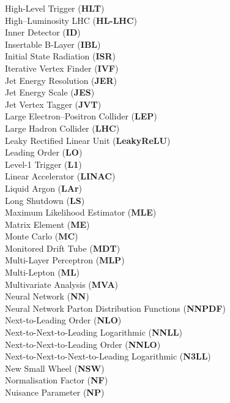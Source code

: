 High-Level Trigger (\textbf{HLT}) \\
High–Luminosity LHC (\textbf{HL-LHC}) \\
Inner Detector (\textbf{ID}) \\
Insertable B-Layer (\textbf{IBL}) \\
Initial State Radiation (\textbf{ISR}) \\
Iterative Vertex Finder (\textbf{IVF}) \\
Jet Energy Resolution (\textbf{JER}) \\
Jet Energy Scale (\textbf{JES}) \\
Jet Vertex Tagger (\textbf{JVT}) \\
Large Electron–Positron Collider (\textbf{LEP}) \\
Large Hadron Collider (\textbf{LHC}) \\
Leaky Rectified Linear Unit (\textbf{LeakyReLU}) \\
Leading Order (\textbf{LO}) \\
Level-1 Trigger (\textbf{L1}) \\
Linear Accelerator (\textbf{LINAC}) \\
Liquid Argon (\textbf{LAr}) \\
Long Shutdown (\textbf{LS}) \\
Maximum Likelihood Estimator (\textbf{MLE}) \\
Matrix Element (\textbf{ME}) \\
Monte Carlo (\textbf{MC}) \\
Monitored Drift Tube (\textbf{MDT}) \\
Multi-Layer Perceptron (\textbf{MLP}) \\
Multi-Lepton (\textbf{ML}) \\
Multivariate Analysis (\textbf{MVA}) \\
Neural Network (\textbf{NN}) \\
Neural Network Parton Distribution Functions (\textbf{NNPDF}) \\
Next-to-Leading Order (\textbf{NLO}) \\
Next-to-Next-to-Leading Logarithmic (\textbf{NNLL}) \\
Next-to-Next-to-Leading Order (\textbf{NNLO}) \\
Next-to-Next-to-Next-to-Leading Logarithmic (\textbf{N3LL}) \\
New Small Wheel (\textbf{NSW}) \\
Normalisation Factor (\textbf{NF}) \\
Nuisance Parameter (\textbf{NP}) \\
